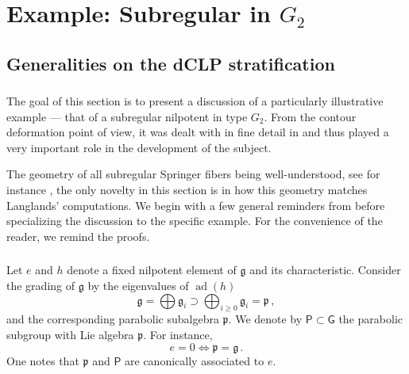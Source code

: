 \documentclass[14pt]{extarticle}
\newcommand{\bG}{\mathsf{G}}
\newcommand{\sP}{\mathsf{P}}
\newcommand{\fg}{\mathfrak{g}}
\newcommand{\fp}{\mathfrak{p}}
\DeclareMathOperator{\ad}{ad}
\theoremstyle{definition}
\begin{document}




\section{Example: Subregular in $G_2$}
\label{sectG2}

\subsection{Generalities on the dCLP stratification}

\subsubsection{}
The goal of this section is to present a discussion of a
particularly illustrative example --- that of a subregular nilpotent
in type $G_2$. From the contour deformation point of view, it
was dealt with in fine detail in \cite{L} and thus played a very
important role in the development of the subject.

The geometry of all subregular Springer fibers being well-understood,
see for instance \cite{Slodowy}, the only novelty in this section is in how this geometry
matches Langlands' computations. 
We begin with a few general reminders from \cite{dCLP} before
specializing the discussion to the specific example. For the
convenience of the reader, we remind the proofs. 

\subsubsection{}

Let $e$ and $h$ denote a fixed nilpotent element of $\fg$ and its
characteristic. Consider the grading of $\fg$ by the eigenvalues of
$\ad(h)$
\[
  \fg = \bigoplus \fg_{i} \supset \bigoplus_{i\ge 0} \fg_{i} = \fp\,,
\]
and the corresponding parabolic subalgebra $\fp$. We denote by
$\sP\subset \bG$ the parabolic subgroup with Lie algebra $\fp$.
For instance,
\[
  e = 0 \Leftrightarrow \fp = \fg \,.
\]
One notes that $\fp$ and $\sP$ 
are canonically associated to $e$. 
\end{document}
